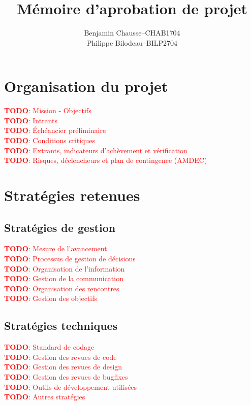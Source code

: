 \documentclass[a11paper, 11pt]{article}
\title{Mémoire d'aprobation de projet}
\author{
  \addtolength{\tabcolsep}{-0.4em}
  \begin{tabular}{rcl} %
  Benjamin Chausse  & -- & CHAB1704 \\
  Philippe Bilodeau & -- & BILP2704 \\
  \end{tabular}
}
\newcommand{\todo}[1]{\textcolor{red}{\textbf{TODO}: #1}}
\begin{document}
\maketitle
\newpage
\tableofcontents
\listoftables
\listoffigures
\newpage

\section{Organisation du projet}

\noindent
\todo{Mission - Objectifs}\\
\todo{Intrants}\\
\todo{Échéancier préliminaire}\\
\todo{Conditions critiques}\\
\todo{Extrants, indicateurs d’achèvement et vérification}\\
\todo{Risques, déclencheurs et plan de contingence (AMDEC)}\\

\section{Stratégies retenues}

\subsection{Stratégies de gestion}

\noindent
\todo{Mesure de l’avancement}\\
\todo{Processus de gestion de décisions}\\
\todo{Organisation de l’information}\\
\todo{Gestion de la communication}\\
\todo{Organisation des rencontres}\\
\todo{Gestion des objectifs}\\

\subsection{Stratégies techniques}

\noindent
\todo{Standard de codage}\\
\todo{Gestion des revues de code}\\
\todo{Gestion des revues de design}\\
\todo{Gestion des revues de bugfixes}\\
\todo{Outils de développement utilisées}\\
\todo{Autres stratégies}\\
\end{document}

